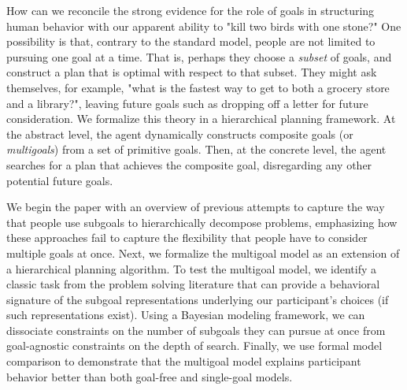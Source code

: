 \documentclass[10pt,letterpaper]{article}
\begin{document}
How can we reconcile the strong evidence for the role of goals in structuring human behavior \citep{Cooper2006} with our apparent ability to "kill two birds with one stone?" One possibility is that, contrary to the standard model, people are not limited to pursuing one goal at a time. That is, perhaps they choose a \textit{subset} of goals, and construct a plan that is optimal with respect to that subset.
They might ask themselves, for example, "what is the fastest way to get to both a grocery store and a library?", leaving future goals such as dropping off a letter for future consideration.
We formalize this theory in a hierarchical planning framework.
At the abstract level, the agent dynamically constructs composite goals (or \textit{multigoals}) from a set of primitive goals. Then, at the concrete level, the agent searches for a plan that achieves the composite goal, disregarding any other potential future goals. 

We begin the paper with an overview of previous attempts to capture the way that people use subgoals to hierarchically decompose problems, emphasizing how these approaches fail to capture the flexibility that people have to consider multiple goals at once. Next, we formalize the multigoal model as an extension of a hierarchical planning algorithm. To test the multigoal model, we identify a classic task from the problem solving literature that can provide a behavioral signature of the subgoal representations underlying our participant's choices (if such representations exist). Using a Bayesian modeling framework, we can dissociate constraints on the number of subgoals they can pursue at once from goal-agnostic constraints on the depth of search. Finally, we use formal model comparison to demonstrate that the multigoal model explains participant behavior better than both goal-free and single-goal models.


\end{document}
